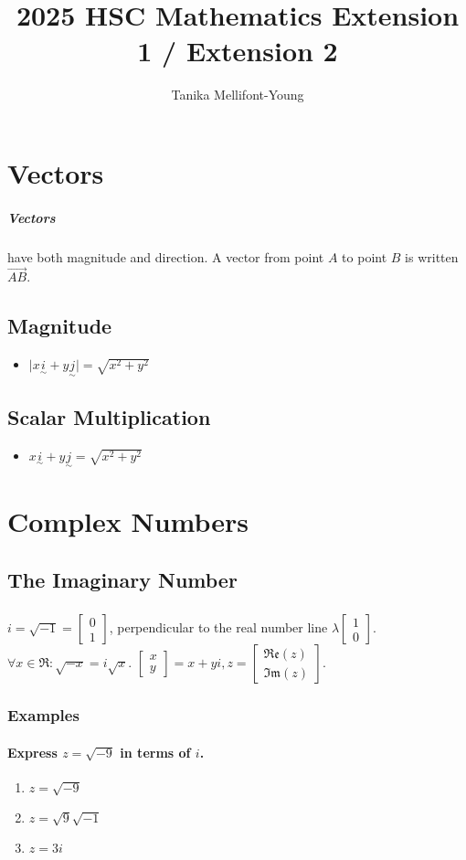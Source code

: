 \documentclass{report}
\title{2025 HSC Mathematics Extension 1 / Extension 2}
\author{Tanika Mellifont-Young}
\renewcommand{\vmatrix}[2]{\begin{bmatrix}#1\\#2\end{bmatrix}}
\newcommand{\vtilde}[1]{\underset{\sim}{#1}}
\newcommand{\vtildeset}[2]{#1\vtilde{i}+#2\vtilde{j}}
\newcommand{\re}[1]{\mathfrak{Re}(#1)}
\newcommand{\im}[1]{\mathfrak{Im}(#1)}
\newcommand{\abs}[1]{\mathopen|#1\mathclose|}
\newcommand{\realnumbers}{\mathfrak{R}}
\begin{document}
    \maketitle
    \newpage
    \chapter{Vectors}
        \paragraph{Vectors}
            have both magnitude and direction. A vector from point $A$ to point $B$ is written $\vec{AB}$.
        \section{Magnitude}
            \begin{itemize}
                \item $\abs{\vtildeset{x}{y}}=\sqrt{x^2+y^2}$
            \end{itemize}
        \section{Scalar Multiplication}
        \begin{itemize}
            \item $\vtildeset{x}{y}=\sqrt{x^2+y^2}$
        \end{itemize}
    \chapter{Complex Numbers}
        \section{The Imaginary Number}
            \paragraph{}
                $i=\sqrt{-1}=\vmatrix{0}{1}$, perpendicular to the real number line $\lambda\vmatrix{1}{0}$. $\forall x\in\realnumbers:\sqrt{-x}=i\sqrt{x}$. $\vmatrix{x}{y}=x+yi,z=\vmatrix{\re{z}}{\im{z}}$.
            \subsection{Examples}
                \subsubsection{Express $z=\sqrt{-9}$ in terms of $i$.}
                    \begin{enumerate}
                        \item $z=\sqrt{-9}$
                        \item $z=\sqrt{9}\sqrt{-1}$
                        \item $z=3i$
                    \end{enumerate}
\end{document}
